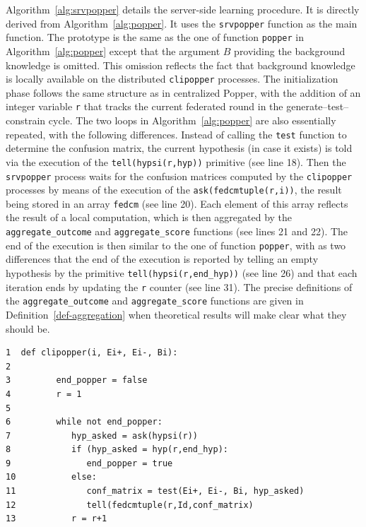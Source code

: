 Algorithm~\ref{alg:srvpopper} details the server-side learning procedure. It is directly derived from Algorithm~\ref{alg:popper}.
It uses the \texttt{srvpopper} function as the main function. The prototype is the same as the one of function \texttt{popper} in Algorithm~\ref{alg:popper} except that the argument $B$ providing the background knowledge is omitted. 
This omission reflects the fact that background knowledge is locally available on the distributed \texttt{clipopper} processes.
%
The initialization phase follows the same structure as in centralized Popper, with the addition of an integer variable \texttt{r} that tracks the current federated round in the generate–test–constrain cycle.
%
The two loops in Algorithm~\ref{alg:popper} are also essentially repeated, with the following differences. Instead of calling the \texttt{test} function to determine the confusion matrix, the current hypothesis (in case it exists) is told via the execution of the \texttt{tell(hypsi(r,hyp))} primitive (see line 18). Then the \texttt{srvpopper} process waits for the confusion matrices computed by the \texttt{clipopper} processes by means of the execution of the \texttt{ask(fedcmtuple(r,i))}, the result being stored in an array \texttt{fedcm} (see line 20). Each element of this array reflects the result of a local computation, which is then aggregated by the \texttt{aggregate\_outcome} and \texttt{aggregate\_score} functions (see lines 21 and 22). The end of the execution is then similar to the one of function \texttt{popper}, with as two differences that the end of the execution is reported by telling an empty hypothesis by the primitive \texttt{tell(hypsi(r,end\_hyp))} (see line 26) and that each iteration ends by updating the \texttt{r} counter (see line 31). The precise definitions of the \texttt{aggregate\_outcome} and \texttt{aggregate\_score} functions are given in Definition~\ref{def-aggregation} when theoretical results will make clear what they should be.


\begin{algorithm}[!t]
  \caption{Clipopper client}
  \label{alg:clipopper}
  \small
  \begin{lstlisting}
1  def clipopper(i, Ei+, Ei-, Bi):
2  
3         end_popper = false
4         r = 1
5  
6         while not end_popper:
7            hyp_asked = ask(hypsi(r))
8            if (hyp_asked = hyp(r,end_hyp):
9               end_popper = true
10           else:
11              conf_matrix = test(Ei+, Ei-, Bi, hyp_asked)
12              tell(fedcmtuple(r,Id,conf_matrix)
13           r = r+1
  \end{lstlisting}
\end{algorithm}



